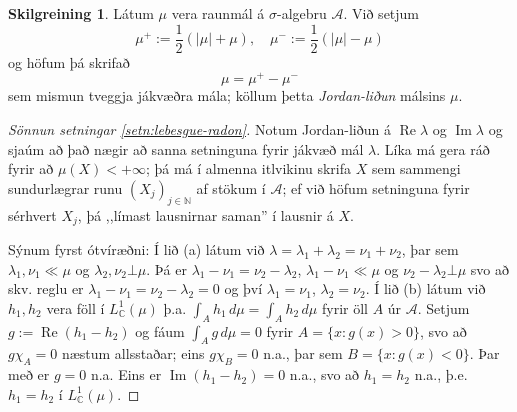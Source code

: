 \documentclass[a4paper,icelandic,11pt]{book}
\theoremstyle{plain}      \newtheorem{setn}{Setning}[chapter]
\theoremstyle{definition} \newtheorem{skilgr}[setn]{Skilgreining}
\theoremstyle{remark}     \newtheorem*{ath}{Athugasemd}
\newcommand{\C}{\mathbb C}
\newcommand{\N}{\mathbb N}
\DeclareMathOperator{\im}{Im}
\DeclareMathOperator{\re}{Re}
\begin{document}
\begin{skilgr}
  Látum $\mu$ vera raunmál á $\sigma$-algebru $\mathcal A$. Við setjum 
  \[
  \mu^{+} := \frac 12 (|\mu|+\mu),
  \quad
  \mu^{-} := \frac 12 (|\mu|-\mu)
  \]
  og höfum þá skrifað 
  \[
  \mu = \mu^{+} - \mu^{-}
  \]
  sem mismun tveggja jákvæðra mála; köllum þetta
  \emph{Jordan-liðun} málsins $\mu$.
\end{skilgr}
\begin{proof}
  [Sönnun setningar \ref{setn:lebesgue-radon}]
  Notum Jordan-liðun á $\re\lambda$ og $\im\lambda$ og sjaúm að það
  nægir að sanna setninguna fyrir jákvæð mál $\lambda$. Líka má gera
  ráð fyrir að $\mu(X)<+\infty$; þá má í almenna itlvikinu skrifa $X$
  sem sammengi sundurlægrar runu $(X_{j})_{j\in\N}$ af stökum í
  $\mathcal A$; ef við höfum setninguna fyrir sérhvert $X_{j}$, þá
  ,,límast lausnirnar saman'' í lausnir á $X$.

  Sýnum fyrst ótvíræðni: Í lið (a) látum við $\lambda =
  \lambda_{1}+\lambda_{2}=\nu_{1}+\nu_{2}$, þar sem
  $\lambda_{1},\nu_{1}\ll\mu$ og $\lambda_{2},\nu_{2}\bot\mu$. Þá er
  $\lambda_{1}-\nu_{1}=\nu_{2}-\lambda_{2}$,
  $\lambda_{1}-\nu_{1}\ll\mu$ og $\nu_{2}-\lambda_{2}\bot\mu$ svo að
  skv. reglu er $\lambda_{1}-\nu_{1}=\nu_{2}-\lambda_{2}=0$ og því
  $\lambda_{1}=\nu_{1}$, $\lambda_{2}=\nu_{2}$. Í lið (b) látum við
  $h_{1},h_{2}$ vera föll í $L^{1}_{\C}(\mu)$
  þ.a. $\int_{A}h_{1}\,d\mu = \int_{A}h_{2}\,d\mu$ fyrir öll $A$ úr
  $\mathcal A$. Setjum $g := \re(h_{1} - h_{2})$ og fáum
  $\int_{A}g\,d\mu = 0$ fyrir $A = \{ x : g(x) > 0 \}$, svo að
  $g\chi_{A} = 0$ næstum allsstaðar; eins $g\chi_{B} = 0$ n.a., þar
  sem $B = \{x : g(x)<0\}$. Þar með er $g = 0$ n.a. Eins er
  $\im(h_{1}-h_{2}) = 0$ n.a., svo að $h_{1} = h_{2}$ n.a.,
  þ.e. $h_{1} = h_{2}$ í $L_{\C}^{1}(\mu)$.


\end{proof}
\end{document}
